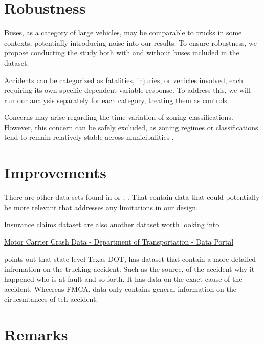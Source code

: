 \documentclass[
  12pt]{article}
\begin{document}
\section{\texorpdfstring{\textbf{Robustness}}{Robustness}}\label{robustness}

Buses, as a category of large vehicles, may be comparable to trucks in
some contexts, potentially introducing noise into our results. To ensure
robustness, we propose conducting the study both with and without buses
included in the dataset.

Accidents can be categorized as fatalities, injuries, or vehicles
involved, each requiring its own specific dependent variable response.
To address this, we will run our analysis separately for each category,
treating them as controls.

Concerns may arise regarding the time variation of zoning
classifications. However, this concern can be safely excluded, as zoning
regimes or classifications tend to remain relatively stable across
municipalities \citep{mclaughlinLandUseRegulation2012}.

\section{\texorpdfstring{\textbf{Improvements}}{Improvements}}\label{improvements}

There are other data sets found in \citep{NHTSAFileDownloads} or
\citep{FatalityAnalysisReporting} ; . That contain data that could
potentially be more relevant that addresses any limitations in our
design.

Insurance claims dataset are also another dataset worth looking into

\href{https://data.transportation.gov/Trucking-and-Motorcoaches/Motor-Carrier-Crash-Data-/b8e5-isfj/about_data}{Motor
Carrier Crash Data - \textbar{} Department of Transportation - Data
Portal}

\citet{liangSafetyInspectionsImprove2021} points out that state level
Texas DOT, has dataset that contain a more detailed infromation on the
trucking accident. Such as the source, of the accident why it happened
who is at fault and so forth. It has data on the exact cause of the
accident. Wheereas FMCA, data only contains general information on the
cirucsmtances of teh accident.

\section{Remarks}\label{remarks}
\end{document}
